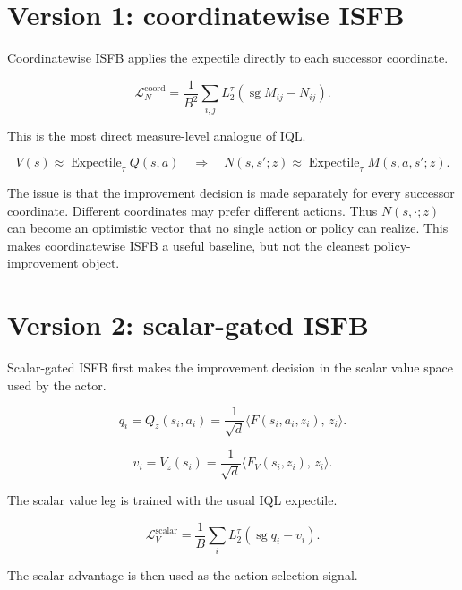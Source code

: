 \documentclass[11pt]{article}
\newcommand{\sg}{\operatorname{sg}}
\newcommand{\inner}[2]{\langle #1,\, #2\rangle}
\newcommand{\Fmap}{F}
\newcommand{\Vmap}{F_V}
\newcommand{\Lexp}{L^{\tau}_2}
\begin{document}
\section{Version 1: coordinatewise ISFB}

Coordinatewise ISFB applies the expectile directly to each successor coordinate.

\begin{equation}
\mathcal L_N^{\mathrm{coord}}=\frac{1}{B^2}\sum_{i,j}\Lexp\!\left(\sg M_{ij}-N_{ij}\right).
\end{equation}

This is the most direct measure-level analogue of IQL.

\begin{equation}
V(s)\approx \operatorname{Expectile}_\tau Q(s,a)\quad\Longrightarrow\quad N(s,s';z)\approx \operatorname{Expectile}_\tau M(s,a,s';z).
\end{equation}

The issue is that the improvement decision is made separately for every successor coordinate.
Different coordinates may prefer different actions.
Thus $N(s,\cdot;z)$ can become an optimistic vector that no single action or policy can realize.
This makes coordinatewise ISFB a useful baseline, but not the cleanest policy-improvement object.

\section{Version 2: scalar-gated ISFB}

Scalar-gated ISFB first makes the improvement decision in the scalar value space used by the actor.

\begin{equation}
q_i=Q_z(s_i,a_i)=\frac{1}{\sqrt d}\inner{\Fmap(s_i,a_i,z_i)}{z_i}.
\end{equation}

\begin{equation}
v_i=V_z(s_i)=\frac{1}{\sqrt d}\inner{\Vmap(s_i,z_i)}{z_i}.
\end{equation}

The scalar value leg is trained with the usual IQL expectile.

\begin{equation}
\mathcal L_V^{\mathrm{scalar}}=\frac{1}{B}\sum_i\Lexp\!\left(\sg q_i-v_i\right).
\end{equation}

The scalar advantage is then used as the action-selection signal.
\end{document}
